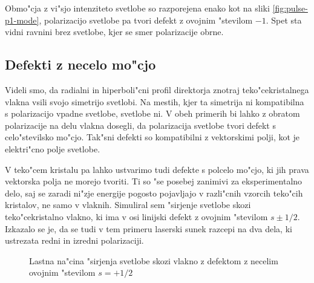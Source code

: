 \documentclass[a4paper,10pt]{article}
\begin{document}
Obmo"cja z vi"sjo intenziteto svetlobe so razporejena enako kot na sliki \ref{fig:pulse-p1-mode}, polarizacijo svetlobe pa tvori defekt z ovojnim "stevilom $-1$. 
Spet sta vidni ravnini brez svetlobe, kjer se smer polarizacije obrne. 

\subsection{Defekti z necelo mo"cjo}

Videli smo, da radialni in hiperboli"cni profil direktorja znotraj teko"cekristalnega vlakna vsili svojo simetrijo svetlobi. 
Na mestih, kjer ta simetrija ni kompatibilna s polarizacijo vpadne svetlobe, svetlobe ni. 
V obeh primerih bi lahko z obratom polarizacije na delu vlakna dosegli, da polarizacija svetlobe tvori defekt s celo"stevilsko mo"cjo. 
Tak"sni defekti so kompatibilni z vektorskimi polji, kot je elektri"cno polje svetlobe. 

V teko"cem kristalu pa lahko ustvarimo tudi defekte s polcelo mo"cjo, ki jih prava vektorska polja ne morejo tvoriti. 
Ti so "se posebej zanimivi za eksperimentalno delo, saj se zaradi ni"zje energije pogosto pojavljajo v razli"cnih vzorcih teko"cih kristalov, ne samo v vlaknih. 
Simuliral sem "sirjenje svetlobe skozi teko"cekristalno vlakno, ki ima v osi linijski defekt z ovojnim "stevilom $s \pm 1/2$. 
Izkazalo se je, da se tudi v tem primeru laserski sunek razcepi na dva dela, ki ustrezata redni in izredni polarizaciji. 

\begin{figure}[h]
 \centering
 \caption{Lastna na"cina "sirjenja svetlobe skozi vlakno z defektom z necelim ovojnim "stevilom $s=+1/2$}
 \label{fig:pulse-p12-mode}
\end{figure}
\end{document}
